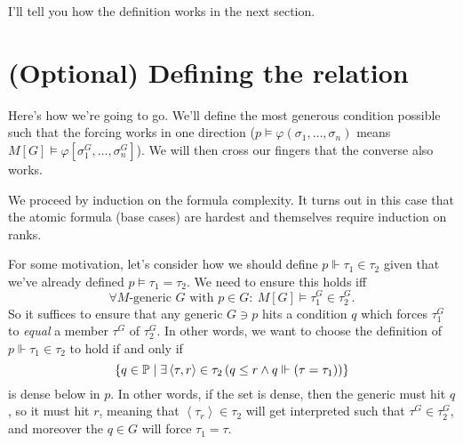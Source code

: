 I'll tell you how the definition works in the next section.

\section{(Optional) Defining the relation}
Here's how we're going to go.
We'll define the most generous condition possible such that
the forcing works in one direction ($p \vDash \varphi(\sigma_1, \dots, \sigma_n)$ means
$M[G] \vDash \varphi[\sigma_1^G, \dots, \sigma_n^G]$).
We will then cross our fingers that the converse also works.

We proceed by induction on the formula complexity.
It turns out in this case that the atomic formula (base cases)
are hardest and themselves require induction on ranks.

For some motivation, let's consider how we should define $p \Vdash \tau_1 \in \tau_2$ given that we've already defined $p \vDash \tau_1 = \tau_2$.
We need to ensure this holds iff
\[ \forall \text{$M$-generic $G$ with $p \in G$}:
	\ M[G] \vDash \tau_1^G \in \tau_2^G. \]
So it suffices to ensure that any generic $G \ni p$ hits a condition $q$ which forces $\tau_1^G$ to \emph{equal} a member $\tau^G$ of $\tau_2^G$.
In other words, we want to choose the definition of $p \Vdash \tau_1 \in \tau_2$ to hold if and only if
\[
	\left\{ q \in \mathbb P
	\mid \exists \left<\tau, r\right> \in \tau_2 
	\left( q \le r \land q \Vdash(\tau=\tau_1) \right)
	\right\}
\]
is dense below in $p$.
In other words, if the set is dense, then the generic must hit $q$, so it must hit $r$, meaning that $\left<\tau_r\right> \in \tau_2$ will get interpreted such that $\tau^G \in \tau_2^G$, and moreover the $q \in G$ will force $\tau_1 = \tau$.

